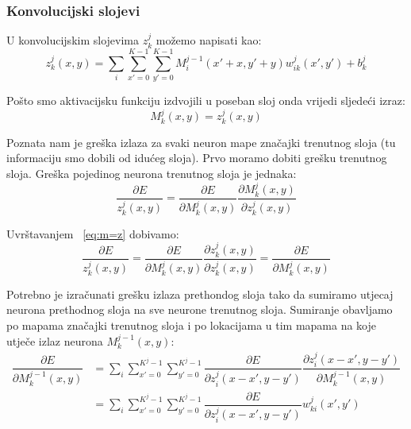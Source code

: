 \documentclass[times, utf8, zavrsni]{fer}
\begin{document}
\subsubsection{Konvolucijski slojevi}
U konvolucijskim slojevima $z_k^j$ možemo napisati kao:
\begin{equation}
z^j_k (x, y) = \sum_i \sum_{x'=0}^{K-1} \sum_{y'=0}^{K-1} M^{j-1}_i (x' + x, y' + y) w^j_{ik} (x', y') + b^j_k
\end{equation}

Pošto smo aktivacijsku funkciju izdvojili u poseban sloj onda vrijedi sljedeći izraz:
\begin{equation}\label{eq:m=z}
M^j_k (x, y) = z^j_k (x, y)
\end{equation}

Poznata nam je greška izlaza za svaki neuron mape značajki trenutnog sloja (tu informaciju smo dobili od idućeg sloja). Prvo moramo dobiti grešku trenutnog sloja. Greška pojedinog neurona trenutnog sloja je jednaka: 
\begin{equation}
\dfrac{\partial E}{z^j_k (x, y)} = \dfrac{\partial E}{\partial M^j_k (x, y)} \dfrac{\partial M^j_k (x, y)}{\partial z^j_k (x, y)}
\end{equation}

Uvrštavanjem ~\ref{eq:m=z} dobivamo:
\begin{equation}
\dfrac{\partial E}{z^j_k (x, y)} = \dfrac{\partial E}{\partial M^j_k (x, y)} \dfrac{\partial z^j_k (x, y)}{\partial z^j_k (x, y)} = \dfrac{\partial E}{\partial M^j_k (x, y)}
\end{equation}

Potrebno je izračunati  grešku izlaza prethondog sloja tako da sumiramo utjecaj neurona prethodnog sloja na sve neurone trenutnog sloja. Sumiranje obavljamo po mapama značajki trenutnog sloja i po lokacijama u tim mapama na koje utječe izlaz neurona $M^{j-1}_k (x, y)$:
\begin{equation}\label{eq:conv-sloj-err}
\begin{split}
\dfrac{\partial E}{\partial M^{j-1}_k (x, y)} &= \sum_i \sum_{x'=0}^{K^j-1} \sum_{y'=0}^{K^j-1} \dfrac{\partial E}{\partial z^j_{i} (x - x',y - y')} \dfrac{\partial z^j_{i} (x - x',y - y')}{\partial M^{j-1}_k (x, y)} \\
 &= \sum_i \sum_{x'=0}^{K^j-1} \sum_{y'=0}^{K^j-1} \dfrac{\partial E}{\partial z^j_{i} (x - x', y - y')} w^j_{ki}(x', y')
\end{split}
\end{equation}
\end{document}
